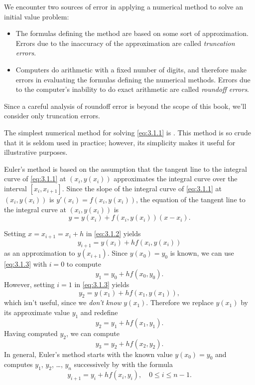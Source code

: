 We encounter two sources of error
in applying a numerical method to solve an initial value problem:
\begin{itemize}
\item
The formulas defining the method are based on some sort of
approximation. Errors due to the inaccuracy of the approximation are
called
\emph{\color{blue}truncation errors}.
\item
Computers do arithmetic with a fixed number of digits, and therefore
make errors in evaluating the formulas defining the numerical methods.
Errors due to the computer's inability to do exact arithmetic are
called
\emph{\color{blue}roundoff errors}.
\end{itemize}

Since a careful analysis of roundoff error is beyond the scope of this
book, we'll consider only truncation errors.



The simplest numerical method for solving \eqref{eq:3.1.1} is
.
This method is so crude that it
is seldom used in practice;     however, its simplicity makes it useful
for illustrative purposes.

Euler's method is based on the assumption that the tangent line to the
integral curve of \eqref{eq:3.1.1} at $(x_i,y(x_i))$ approximates the
integral curve over the interval $[x_i,x_{i+1}]$.
 Since the slope of the integral curve of
\eqref{eq:3.1.1} at $(x_i,y(x_i))$ is $y'(x_i)=f(x_i,y(x_i))$, the
equation of the tangent line to the integral curve at $(x_i,y(x_i))$
is
\begin{equation} \label{eq:3.1.2}
y=y(x_i)+f(x_i,y(x_i))(x-x_i).
\end{equation}

Setting $x=x_{i+1}=x_i+h$ in \eqref{eq:3.1.2} yields
\begin{equation} \label{eq:3.1.3}
y_{i+1}=y(x_i)+hf(x_i,y(x_i))
\end{equation}
as an approximation to $y(x_{i+1})$. Since $y(x_0)=y_0$ is known, we
can use \eqref{eq:3.1.3} with $i=0$ to compute
\[
y_1=y_0+hf(x_0,y_0).
\]
However, setting $i=1$ in \eqref{eq:3.1.3} yields
\[
y_2=y(x_1)+hf(x_1,y(x_1)),
\]
which isn't  useful, since we \emph{\color{blue}don't know} $y(x_1)$. Therefore
we replace $y(x_1)$ by its approximate value $y_1$ and redefine
\[
y_2=y_1+hf(x_1,y_1).
\]
Having computed $y_2$, we can  compute
\[
y_3=y_2+hf(x_2,y_2).
\]
In general, Euler's method starts with the known value $y(x_0)=y_0$
and computes $y_1$, $y_2$, \dots, $y_n$ successively by with the
 formula
\begin{equation} \label{eq:3.1.4}
y_{i+1}=y_i+hf(x_i,y_i),\quad 0\le i\le n-1.
\end{equation}

